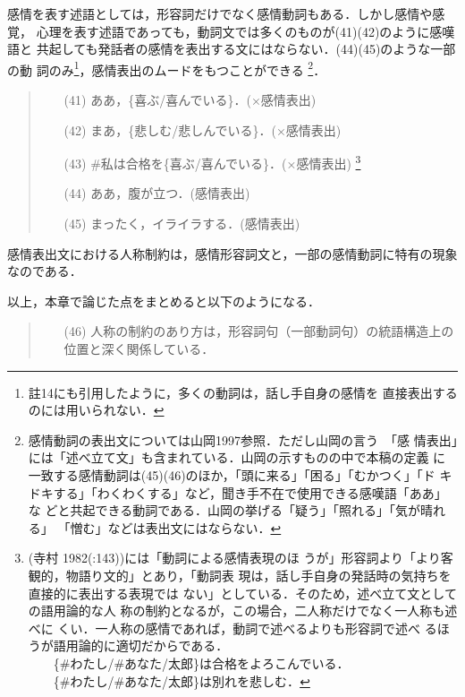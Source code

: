 感情を表す述語としては，形容詞だけでなく感情動詞もある．しかし感情や感覚，
心理を表す述語であっても，動詞文では多くのものが(41)(42)のように感嘆語と
共起しても発話者の感情を表出する文にはならない．(44)(45)のような一部の動
詞のみ\footnote{註14にも引用したように，多くの動詞は，話し手自身の感情を
直接表出するのには用いられない．}，感情表出のムードをもつことができる
\footnote{感情動詞の表出文については山岡1997参照．ただし山岡の言う　「感
情表出」には「述べ立て文」も含まれている．山岡の示すものの中で本稿の定義
に一致する感情動詞は(45)(46)のほか，「頭に来る」「困る」「むかつく」「ド
キドキする」「わくわくする」など，聞き手不在で使用できる感嘆語「ああ」な
どと共起できる動詞である．山岡の挙げる「疑う」「照れる」「気が晴れる」
「憎む」などは表出文にはならない．}．

\vspace{0.3cm}
\begin{quote}
\begin{itemize}
 \item[(41)] ああ，\{喜ぶ/喜んでいる\}．(×感情表出)
 \item[(42)] まあ，\{悲しむ/悲しんでいる\}．(×感情表出)
 \item[(43)] \#私は合格を\{喜ぶ/喜んでいる\}．(×感情表出)
	     \footnote{(寺村 1982(:143))には「動詞による感情表現のほ
	     うが」形容詞より「より客観的，物語り文的」とあり，「動詞表
	     現は，話し手自身の発話時の気持ちを直接的に表出する表現では
	     ない」としている．そのため，述べ立て文としての語用論的な人
	     称の制約となるが，この場合，二人称だけでなく一人称も述べに
	     くい．一人称の感情であれば，動詞で述べるよりも形容詞で述べ
	     るほうが語用論的に適切だからである．\\
	     　　\{\#わたし/\#あなた/太郎\}は合格をよろこんでいる．\\
	     　　\{\#わたし/\#あなた/太郎\}は別れを悲しむ．}
 \item[(44)] ああ，腹が立つ．(感情表出)
 \item[(45)] まったく，イライラする．(感情表出)
\end{itemize}
\end{quote}
\vspace{0.3cm}

感情表出文における人称制約は，感情形容詞文と，一部の感情動詞に特有の現象
なのである．

以上，本章で論じた点をまとめると以下のようになる．

\vspace{0.3cm}
\begin{quote}
\begin{itemize}
 \item[(46)] 人称の制約のあり方は，形容詞句（一部動詞句）の統語構造上の
	     位置と深く関係している．
\end{itemize}
\end{quote}
\vspace{0.3cm}

